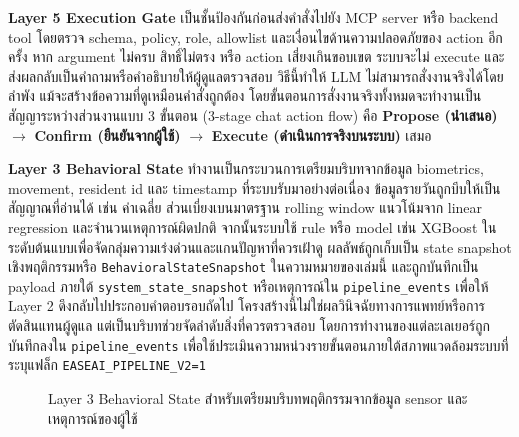 \textbf{Layer 5 Execution Gate} เป็นชั้นป้องกันก่อนส่งคำสั่งไปยัง MCP server หรือ backend tool โดยตรวจ schema, policy, role, allowlist และเงื่อนไขด้านความปลอดภัยของ action อีกครั้ง หาก argument ไม่ครบ สิทธิ์ไม่ตรง หรือ action เสี่ยงเกินขอบเขต ระบบจะไม่ execute และส่งผลกลับเป็นคำถามหรือคำอธิบายให้ผู้ดูแลตรวจสอบ วิธีนี้ทำให้ LLM ไม่สามารถสั่งงานจริงได้โดยลำพัง แม้จะสร้างข้อความที่ดูเหมือนคำสั่งถูกต้อง โดยขั้นตอนการสั่งงานจริงทั้งหมดจะทำงานเป็นสัญญาระหว่างส่วนงานแบบ 3 ขั้นตอน (3-stage chat action flow) คือ \textbf{Propose (นำเสนอ)} $\rightarrow$ \textbf{Confirm (ยืนยันจากผู้ใช้)} $\rightarrow$ \textbf{Execute (ดำเนินการจริงบนระบบ)} เสมอ

\textbf{Layer 3 Behavioral State} ทำงานเป็นกระบวนการเตรียมบริบทจากข้อมูล biometrics, movement, resident id และ timestamp ที่ระบบรับมาอย่างต่อเนื่อง ข้อมูลรายวันถูกบีบให้เป็นสัญญาณที่อ่านได้ เช่น ค่าเฉลี่ย ส่วนเบี่ยงเบนมาตรฐาน rolling window แนวโน้มจาก linear regression และจำนวนเหตุการณ์ผิดปกติ จากนั้นระบบใช้ rule หรือ model เช่น XGBoost ในระดับต้นแบบเพื่อจัดกลุ่มความเร่งด่วนและแกนปัญหาที่ควรเฝ้าดู ผลลัพธ์ถูกเก็บเป็น state snapshot เชิงพฤติกรรมหรือ \texttt{BehavioralStateSnapshot} ในความหมายของเล่มนี้ และถูกบันทึกเป็น payload ภายใต้ \texttt{system\_state\_snapshot} หรือเหตุการณ์ใน \texttt{pipeline\_events} เพื่อให้ Layer 2 ดึงกลับไปประกอบคำตอบรอบถัดไป โครงสร้างนี้ไม่ใช่ผลวินิจฉัยทางการแพทย์หรือการตัดสินแทนผู้ดูแล แต่เป็นบริบทช่วยจัดลำดับสิ่งที่ควรตรวจสอบ โดยการทำงานของแต่ละเลเยอร์ถูกบันทึกลงใน \texttt{pipeline\_events} เพื่อใช้ประเมินความหน่วงรายขั้นตอนภายใต้สภาพแวดล้อมระบบที่ระบุแฟล็ก \texttt{EASEAI\_PIPELINE\_V2=1}

\begin{figure}[!htbp]
    \centering
    \caption{Layer 3 Behavioral State สำหรับเตรียมบริบทพฤติกรรมจากข้อมูล sensor และเหตุการณ์ของผู้ใช้}
    \label{fig:ch3_ai_behavioral_state}
\end{figure}
\FloatBarrier

